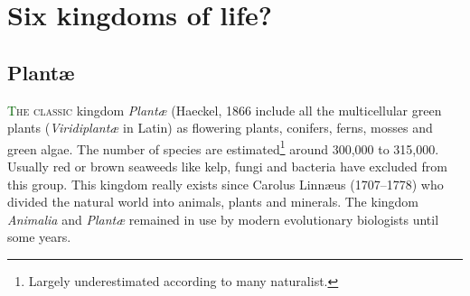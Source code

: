 \fancyhead[LO]{\estcab{\rightmark}} %
\fancyhead[RO]{\estcab{\leftmark}}


\fancyfoot[LO]{
\ornimpar \\ \large \hfill \sffamily\bf \textcolor{darkgray}{\leafNE ~~~ \thepage}
}

\newenvironment{Section}[1]
{\section{\vspace{0ex}#1}}
{\vspace{12pt}\centering ------- \decofourleft\decofourright ------- \par}



\usepackage{lipsum}
\setlength{\parindent}{1em} %
\pagestyle{fancy}

\renewcommand{\footnoterule}{\vspace{-0.5em}\noindent\textcolor{marron}{\decosix \raisebox{2.9pt}{\line(1,0){100}} \lefthand} \vspace{.5em} }
\usepackage[hang,splitrule]{footmisc}
\addtolength{\footskip}{0.5cm}
\setlength{\footnotemargin}{0.3cm}
\setlength{\footnotesep}{0.4cm} 

\usepackage{chngcntr}




\chapter{Six kingdoms of life?}
\newpage

\section{Plant\ae}
\lettrine[lines=3]{\initfamily\textcolor{darkgreen}{T}}{he classic} kingdom \emph{Plant\ae} (Haeckel, 1866
include all the multicellular green plants (\emph{Viridiplant\ae} in Latin) as flowering  
plants, conifers, ferns, mosses and green algae. The number of species 
are estimated\footnote{Largely underestimated according to many naturalist.} around 300,000 to 315,000. 
Usually red or brown seaweeds like kelp, fungi and bacteria have
excluded from this group.
This kingdom really exists since Carolus Linn\ae us (1707--1778) who 
divided the natural world into animals, plants and minerals. The kingdom \emph{Animalia}  and \emph{Plant\ae} remained 
in use by modern evolutionary biologists until some years.  

